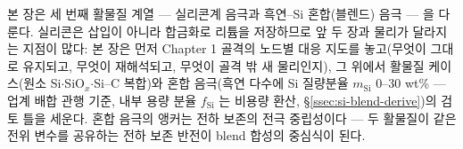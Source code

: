 본 장은 세 번째 활물질 계열 --- 실리콘계 음극과 흑연--Si 혼합(블렌드) 음극 --- 을 다룬다. 실리콘은
삽입이 아니라 합금화로 리튬을 저장하므로 앞 두 장과 물리가 달라지는 지점이 많다: 본 장은 먼저
Chapter 1 골격의 노드별 대응 지도를 놓고(무엇이 그대로 유지되고, 무엇이 재해석되고, 무엇이 골격 밖 새
물리인지), 그 위에서 활물질 케이스(원소 Si$\cdot$SiO$_x$$\cdot$Si--C 복합)와 혼합 음극(흑연 다수에
Si 질량분율 $m_\mathrm{Si}$ 0--30 wt\% --- 업계 배합 관행 기준, 내부 용량 분율 $f_\mathrm{Si}$ 는 비용량 환산, \S\ref{ssec:si-blend-derive})의 검토 틀을 세운다. 혼합 음극의 앵커는 전하 보존의 전극
중립성이다 --- 두 활물질이 같은 전위 변수를 공유하는 전하 보존 반전이 blend 합성의 중심식이 된다.

\tableofcontents
\clearpage
